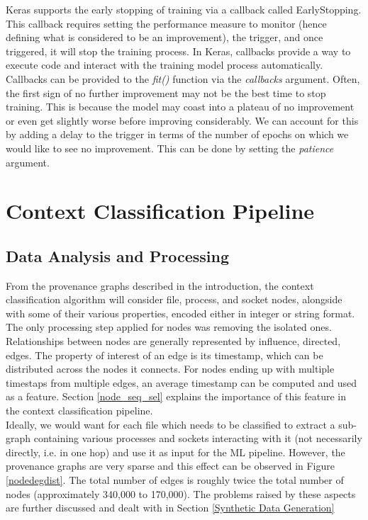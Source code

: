 Keras supports the early stopping of training via a callback called EarlyStopping. This callback requires setting the performance measure to monitor (hence defining what is considered to be an improvement), the trigger, and once triggered, it will stop the training process. In Keras, callbacks provide a way to execute code and interact with the training model process automatically. Callbacks can be provided to the \textit{fit()} function via the \textit{callbacks} argument. Often, the first sign of no further improvement may not be the best time to stop training. This is because the model may coast into a plateau of no improvement or even get slightly worse before improving considerably. We can account for this by adding a delay to the trigger in terms of the number of epochs on which we would like to see no improvement. This can be done by setting the \textit{patience} argument. \\


\section{Context Classification Pipeline}
\subsection{Data Analysis and Processing}

From the provenance graphs described in the introduction, the context classification algorithm will consider file, process, and socket nodes, alongside with some of their various properties, encoded either in integer or string format. The only processing step applied for nodes was removing the isolated ones. Relationships between nodes are generally represented by influence, directed, edges. The property of interest of an edge is its timestamp, which can be distributed across the nodes it connects. For nodes ending up with multiple timestaps from multiple edges, an average timestamp can be computed and used as a feature. Section \ref{node_seq_sel} explains the importance of this feature in the context classification pipeline. \\

Ideally, we would want for each file which needs to be classified to extract a sub-graph containing various processes and sockets interacting with it (not necessarily directly, i.e. in one hop) and use it as input for the ML pipeline. However, the provenance graphs are very sparse and this effect can be observed in Figure \ref{nodedegdist}. The total number of edges is roughly twice the total number of nodes (approximately 340,000 to 170,000). The problems raised by these aspects are further discussed and dealt with in Section \ref{Synthetic Data Generation} \\


